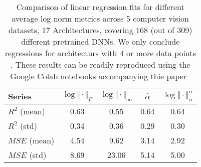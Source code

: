 \begin{table}[t]
\small
\begin{center}
\begin{tabular}{|p{0.75in}|c|c|c|c|}
\hline
Series        & $\log\Vert\cdot\Vert_{F}$ & $\log\Vert\cdot\Vert_{\infty}$ & $\hat{\alpha}$ & $\log\Vert\cdot\Vert^{\alpha}_{\alpha}$ \\
\hline
$R^{2}$ (mean) & 0.63 &0.55 &0.64 &0.64 \\
$R^{2}$ (std)  & 0.34 &0.36 &0.29 &0.30 \\
\hline
$MSE$ (mean)   & 4.54 &9.62 &3.14 &2.92 \\
$MSE$ (std)    & 8.69 &23.06 &5.14 &5.00 \\
\hline
\end{tabular}
\end{center}
\caption{Comparison of linear regression fits for different average log norm metrics across 5 computer vision datasets, 17 Architectures, covering 168 (out of 309) different pretrained DNNs.  We only conclude regressions for architecturs with 4 or more data points .  These results can be readily reproduced using the Google Colab notebooks accompanying thie paper~\cite{notebooks}}
\label{table:results}
\end{table}




